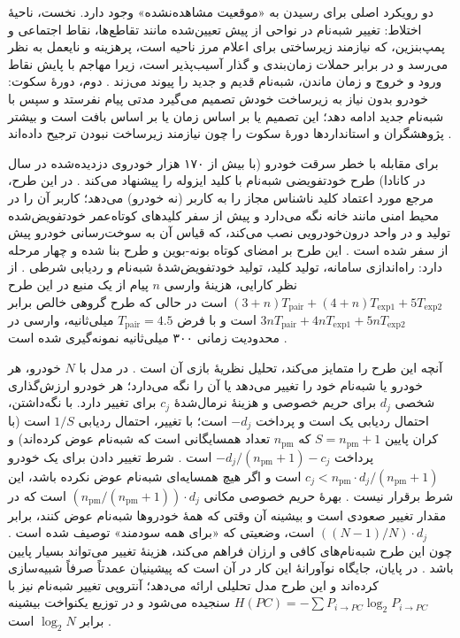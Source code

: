 \documentclass[12pt,a4paper]{article}
\begin{document}
دو رویکرد اصلی برای رسیدن به «موقعیت مشاهده‌نشده» وجود دارد. نخست، ناحیهٔ اختلاط: تغییر شبه‌نام در نواحی از پیش تعیین‌شده مانند تقاطع‌ها، نقاط اجتماعی و پمپ‌بنزین، که نیازمند زیرساختی برای اعلام مرز ناحیه است، پرهزینه و نایعمل به نظر می‌رسد و در برابر حملات زمان‌بندی و گذار آسیب‌پذیر است، زیرا مهاجم با پایش نقاط ورود و خروج و زمان ماندن، شبه‌نام قدیم و جدید را پیوند می‌زند \cite{luPseudonymChangingSocial2012}. دوم، دورهٔ سکوت: خودرو بدون نیاز به زیرساخت خودش تصمیم می‌گیرد مدتی پیام نفرستد و سپس با شبه‌نام جدید ادامه دهد؛ این تصمیم یا بر اساس زمان یا بر اساس بافت است و بیشتر پژوهشگران و استاندارد‌ها دورهٔ سکوت را چون نیازمند زیرساخت نبودن ترجیح داده‌اند \cite{luPseudonymChangingSocial2012}.

برای مقابله با خطر سرقت خودرو (با بیش از ۱۷۰ هزار خودروی دزدیده‌شده در سال در کانادا) طرح خودتفویضی شبه‌نام با کلید ایزوله  را پیشنهاد می‌کند \cite{luPseudonymChangingSocial2012}. در این طرح، مرجع مورد اعتماد کلید ناشناس مجاز را به کاربر (نه خودرو) می‌دهد؛ کاربر آن را در محیط امنی مانند خانه نگه می‌دارد و پیش از سفر کلید‌های کوتاه‌عمر خودتفویض‌شده تولید و در واحد درون‌خودرویی نصب می‌کند، که قیاس آن به سوخت‌رسانی خودرو پیش از سفر شده است \cite{luPseudonymChangingSocial2012}. این طرح بر امضای کوتاه بونه-بوین و طرح  بنا شده و چهار مرحله دارد: راه‌اندازی سامانه، تولید کلید، تولید خودتفویض‌شدهٔ شبه‌نام و ردیابی شرطی \cite{luPseudonymChangingSocial2012}. از نظر کارایی، هزینهٔ وارسی $n$ پیام از یک منبع در این طرح $(3+n)T_{\mathrm{pair}} + (4+n)T_{\mathrm{exp1}} + 5T_{\mathrm{exp2}}$ است در حالی که طرح گروهی خالص  برابر $3nT_{\mathrm{pair}} + 4nT_{\mathrm{exp1}} + 5nT_{\mathrm{exp2}}$ است و با فرض $T_{\mathrm{pair}} = 4.5$ میلی‌ثانیه، وارسی در محدودیت زمانی ۳۰۰ میلی‌ثانیه نمونه‌گیری شده است \cite{luPseudonymChangingSocial2012}.

آنچه این طرح را متمایز می‌کند، تحلیل نظریهٔ بازی آن است \cite{luPseudonymChangingSocial2012}. در مدل با $N$ خودرو، هر خودرو یا شبه‌نام خود را تغییر می‌دهد یا آن را نگه می‌دارد؛ هر خودرو ارزش‌گذاری شخصی $d_j$ برای حریم خصوصی و هزینهٔ نرمال‌شدهٔ $c_j$ برای تغییر دارد. با نگه‌داشتن، احتمال ردیابی یک است و پرداخت $-d_j$ است؛ با تغییر، احتمال ردیابی $1/S$ است (با کران پایین $S = n_{\mathrm{pm}}+1$ که $n_{\mathrm{pm}}$ تعداد همسایگانی است که شبه‌نام عوض کرده‌اند) و پرداخت $-d_j/(n_{\mathrm{pm}}+1) - c_j$ است \cite{luPseudonymChangingSocial2012}. شرط تغییر دادن برای یک خودرو $c_j < n_{\mathrm{pm}}{\cdot}d_j/(n_{\mathrm{pm}}+1)$ است و اگر هیچ همسایه‌ای شبه‌نام عوض نکرده باشد، این شرط برقرار نیست \cite{luPseudonymChangingSocial2012}. بهرهٔ حریم خصوصی مکانی $(n_{\mathrm{pm}}/(n_{\mathrm{pm}}+1)){\cdot}d_j$ است که در مقدار تغییر صعودی است و بیشینه آن وقتی که همهٔ خودرو‌ها شبه‌نام عوض کنند، برابر $((N-1)/N){\cdot}d_j$ است، وضعیتی که «برای همه سودمند» توصیف شده است \cite{luPseudonymChangingSocial2012}. چون این طرح شبه‌نام‌های کافی و ارزان فراهم می‌کند، هزینهٔ تغییر می‌تواند بسیار پایین باشد \cite{luPseudonymChangingSocial2012}. در پایان، جایگاه نوآورانهٔ این کار در آن است که پیشینیان عمدتاً صرفاً شبیه‌سازی کرده‌اند و این طرح مدل تحلیلی ارائه می‌دهد؛ آنتروپی تغییر شبه‌نام نیز با $H(PC) = -\sum P_{i \to PC} \log_2 P_{i \to PC}$ سنجیده می‌شود و در توزیع یکنواخت بیشینه برابر $\log_2 N$ است \cite{luPseudonymChangingSocial2012}.
\end{document}
